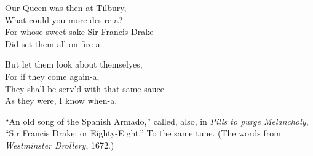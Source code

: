 \begin{dcverse}
\begin{altverse}
Our Queen was then at Tilbury,\\
What could you more desire-a?\\
For whose sweet sake Sir Francis Drake\\
Did set them all on fire-a.
\end{altverse}

\begin{altverse}
But let them look about themselyes,\\
For if they come again-a,\\
They shall be serv’d with that same sauce\\
As they were, I know when-a.
\end{altverse}

\end{dcverse}
\pagebreak

“An old song of the Spanish Armado,” called, also, in \textit{Pills to purge Melancholy},
“Sir Francis Drake: or Eighty-Eight.” To the same tune. (The words
from \textit{Westminster Drollery}, 1672.)


